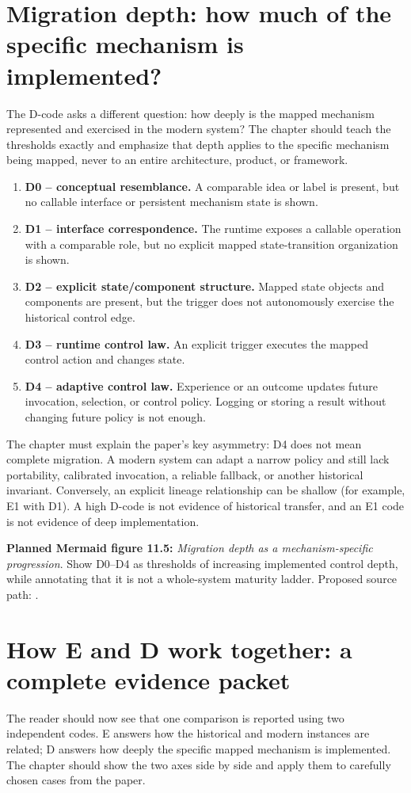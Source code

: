 \section{Migration depth: how much of the specific mechanism is implemented?}
The D-code asks a different question: how deeply is the mapped mechanism represented and exercised in the modern system? The chapter should teach the thresholds exactly and emphasize that depth applies to the specific mechanism being mapped, never to an entire architecture, product, or framework.
\begin{enumerate}
  \item \textbf{D0 -- conceptual resemblance.} A comparable idea or label is present, but no callable interface or persistent mechanism state is shown.
  \item \textbf{D1 -- interface correspondence.} The runtime exposes a callable operation with a comparable role, but no explicit mapped state-transition organization is shown.
  \item \textbf{D2 -- explicit state/component structure.} Mapped state objects and components are present, but the trigger does not autonomously exercise the historical control edge.
  \item \textbf{D3 -- runtime control law.} An explicit trigger executes the mapped control action and changes state.
  \item \textbf{D4 -- adaptive control law.} Experience or an outcome updates future invocation, selection, or control policy. Logging or storing a result without changing future policy is not enough.
\end{enumerate}

The chapter must explain the paper's key asymmetry: D4 does not mean complete migration. A modern system can adapt a narrow policy and still lack portability, calibrated invocation, a reliable fallback, or another historical invariant. Conversely, an explicit lineage relationship can be shallow (for example, E1 with D1). A high D-code is not evidence of historical transfer, and an E1 code is not evidence of deep implementation.

\textbf{Planned Mermaid figure 11.5:} \emph{Migration depth as a mechanism-specific progression}. Show D0--D4 as thresholds of increasing implemented control depth, while annotating that it is not a whole-system maturity ladder. Proposed source path: .

\section{How E and D work together: a complete evidence packet}
The reader should now see that one comparison is reported using two independent codes. E answers how the historical and modern instances are related; D answers how deeply the specific mapped mechanism is implemented. The chapter should show the two axes side by side and apply them to carefully chosen cases from the paper.

